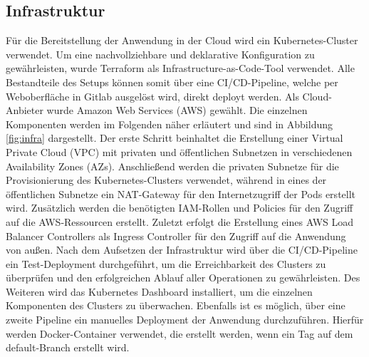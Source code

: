 \documentclass[a4paper, 10pt, conference]{IEEEtran}
\begin{document}
\subsection{Infrastruktur}\label{subsec:infrastruktur}

Für die Bereitstellung der Anwendung in der Cloud wird ein Kubernetes-Cluster \cite{k8s} verwendet. 
Um eine nachvollziehbare und deklarative Konfiguration zu gewährleisten, wurde Terraform \cite{terraform} als Infrastructure-as-Code-Tool verwendet. 
Alle Bestandteile des Setups können somit über eine CI/CD-Pipeline, welche per Weboberfläche in Gitlab ausgelöst wird, direkt deployt werden.
Als Cloud-Anbieter wurde Amazon Web Services (AWS) \cite{aws} gewählt. Die einzelnen Komponenten werden im Folgenden näher erläutert und sind in Abbildung \ref{fig:infra} dargestellt.
Der erste Schritt beinhaltet die Erstellung einer Virtual Private Cloud (VPC) mit privaten und öffentlichen Subnetzen in verschiedenen Availability Zones (AZs).
Anschließend werden die privaten Subnetze für die Provisionierung des Kubernetes-Clusters verwendet, während in eines der öffentlichen Subnetze ein NAT-Gateway für den Internetzugriff der Pods erstellt wird.
Zusätzlich werden die benötigten IAM-Rollen und Policies für den Zugriff auf die AWS-Ressourcen erstellt.
Zuletzt erfolgt die Erstellung eines AWS Load Balancer Controllers als Ingress Controller für den Zugriff auf die Anwendung von außen.
Nach dem Aufsetzen der Infrastruktur wird über die CI/CD-Pipeline ein Test-Deployment durchgeführt, um die Erreichbarkeit des Clusters zu überprüfen und den erfolgreichen Ablauf aller Operationen zu gewährleisten.
Des Weiteren wird das Kubernetes Dashboard installiert, um die einzelnen Komponenten des Clusters zu überwachen.
Ebenfalls ist es möglich, über eine zweite Pipeline ein manuelles Deployment der Anwendung durchzuführen.
Hierfür werden Docker-Container \cite{docker} verwendet, die erstellt werden, wenn ein Tag auf dem default-Branch erstellt wird.
\end{document}
